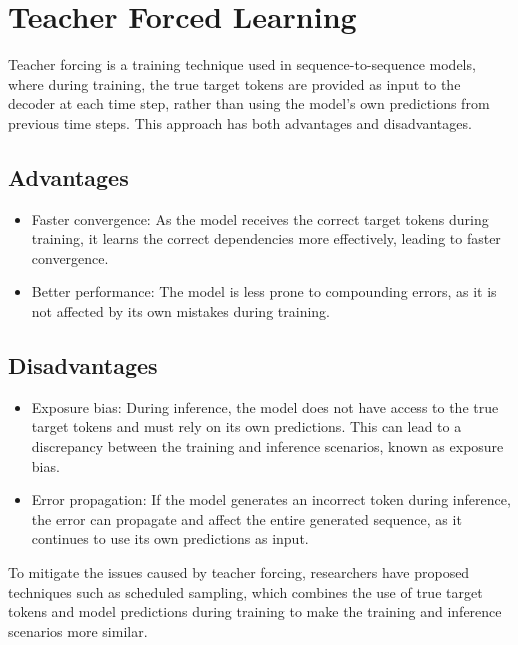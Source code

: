 \documentclass[12pt]{article}
\begin{document}
\section{Teacher Forced Learning}
\label{sec:teacher_forced_learning}

Teacher forcing is a training technique used in sequence-to-sequence models, where during training, the true target tokens are provided as input to the decoder at each time step, rather than using the model's own predictions from previous time steps. This approach has both advantages and disadvantages.

\subsection{Advantages}
\begin{itemize}
    \item Faster convergence: As the model receives the correct target tokens during training, it learns the correct dependencies more effectively, leading to faster convergence.
    \item Better performance: The model is less prone to compounding errors, as it is not affected by its own mistakes during training.
\end{itemize}

\subsection{Disadvantages}
\begin{itemize}
    \item Exposure bias: During inference, the model does not have access to the true target tokens and must rely on its own predictions. This can lead to a discrepancy between the training and inference scenarios, known as exposure bias.
    \item Error propagation: If the model generates an incorrect token during inference, the error can propagate and affect the entire generated sequence, as it continues to use its own predictions as input.
\end{itemize}
To mitigate the issues caused by teacher forcing, researchers have proposed techniques such as scheduled sampling, which combines the use of true target tokens and model predictions during training to make the training and inference scenarios more similar.
\end{document}
